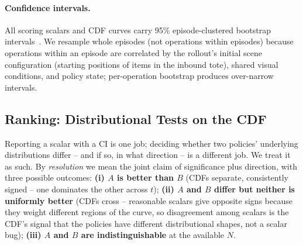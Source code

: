 \documentclass{article}
\begin{document}
\paragraph{Confidence intervals.} All scoring scalars and CDF curves carry 95\% episode-clustered bootstrap intervals~\cite{efron1993}. We resample whole episodes (not operations within episodes) because operations within an episode are correlated by the rollout's initial scene configuration (starting positions of items in the inbound tote), shared visual conditions, and policy state; per-operation bootstrap produces over-narrow intervals.

\subsection{Ranking: Distributional Tests on the CDF}\label{sec:framework-test}

Reporting a scalar with a CI is one job; deciding whether two policies' underlying distributions differ -- and if so, in what direction -- is a different job. We treat it as such. By \emph{resolution} we mean the joint claim of significance plus direction, with three possible outcomes: \textbf{(i) $A$ is better than $B$} (CDFs separate, consistently signed -- one dominates the other across $t$); \textbf{(ii) $A$ and $B$ differ but neither is uniformly better} (CDFs cross -- reasonable scalars give opposite signs because they weight different regions of the curve, so disagreement among scalars is the CDF's signal that the policies have different distributional shapes, not a scalar bug); \textbf{(iii) $A$ and $B$ are indistinguishable} at the available $N$.
\end{document}
